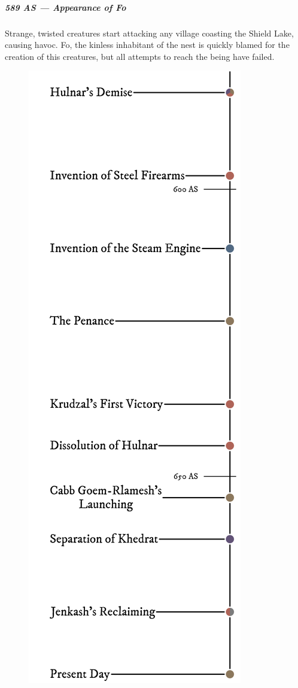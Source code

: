 \subparagraph{589 AS --- Appearance of Fo} Strange, twisted creatures start attacking any village coasting the Shield Lake, causing havoc.
Fo, the kinless inhabitant of the nest is quickly blamed for the creation of this creatures, but all attempts to reach the being have failed.

\begin{figure}[H]
    \centering \includegraphics{01yuadrem/img/30history_vi.png}
\end{figure}

